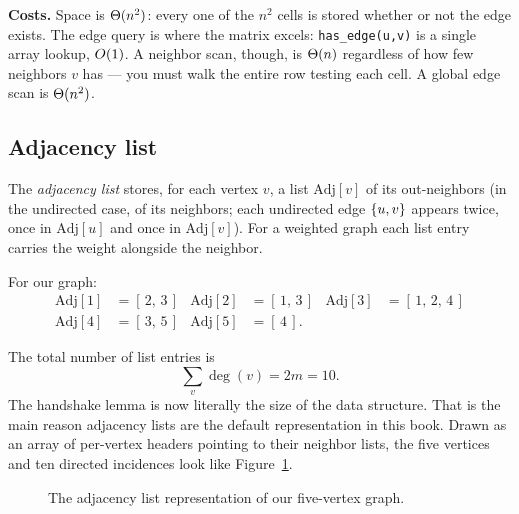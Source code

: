 \textbf{Costs.} Space is $\Theta(n^2)$: every one of the $n^2$ cells is stored
whether or not the edge exists. The edge query is where the matrix excels:
\texttt{has\_edge(u,v)} is a single array lookup, $O(1)$. A neighbor
scan, though, is $\Theta(n)$ regardless of how few neighbors $v$ has --- you must
walk the entire row testing each cell. A global edge scan is $\Theta(n^2)$.

\subsection{Adjacency list}

\begin{definition}
\label{ch01:def-adjlist}
The \emph{adjacency list} stores, for each vertex $v$, a list
$\mathrm{Adj}[v]$ of its out-neighbors (in the undirected case, of its
neighbors; each undirected edge $\{u,v\}$ appears twice, once in
$\mathrm{Adj}[u]$ and once in $\mathrm{Adj}[v]$). For a weighted graph each list
entry carries the weight alongside the neighbor.
\end{definition}

For our graph:
\[
\begin{aligned}
\mathrm{Adj}[1] &= [\,2,\,3\,] & \mathrm{Adj}[2] &= [\,1,\,3\,] &
\mathrm{Adj}[3] &= [\,1,\,2,\,4\,] \\
\mathrm{Adj}[4] &= [\,3,\,5\,] & \mathrm{Adj}[5] &= [\,4\,] .
\end{aligned}
\]

The total number of list entries is 
\[ \sum_v \deg(v) = 2m = 10. \]
The handshake lemma is now literally the size of the data structure. That is the main reason
adjacency lists are the default representation in this book. Drawn as an array of
per-vertex headers pointing to their neighbor lists, the five vertices and ten
directed incidences look like Figure~\ref{fig:ch01-adj-list}.

\begin{figure}[htbp]
\centering
{}
\caption{The adjacency list representation of our five-vertex graph.}
\label{fig:ch01-adj-list}
\end{figure}

